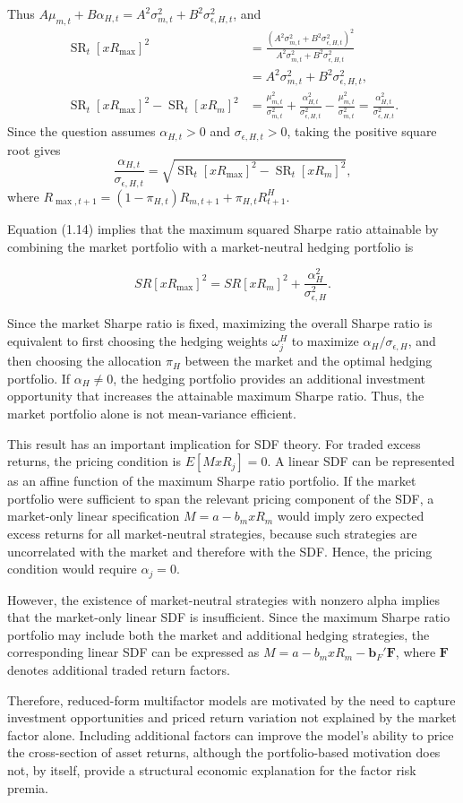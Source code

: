 \documentclass[11pt]{article}
\begin{document}
Thus $A\mu_{m,t}+B\alpha_{H,t}
=A^2\sigma^2_{m,t}+B^2\sigma^2_{\epsilon,H,t}$, and
\begin{align*}
\operatorname{SR}_t[xR_{\max}]^2
&=\frac{(A^2\sigma^2_{m,t}+B^2\sigma^2_{\epsilon,H,t})^2}
{A^2\sigma^2_{m,t}+B^2\sigma^2_{\epsilon,H,t}}\\
&=A^2\sigma^2_{m,t}+B^2\sigma^2_{\epsilon,H,t},\\
\operatorname{SR}_t[xR_{\max}]^2-\operatorname{SR}_t[xR_m]^2
&=\frac{\mu_{m,t}^2}{\sigma^2_{m,t}}
+\frac{\alpha_{H,t}^2}{\sigma^2_{\epsilon,H,t}}
-\frac{\mu_{m,t}^2}{\sigma^2_{m,t}}
=\frac{\alpha_{H,t}^2}{\sigma^2_{\epsilon,H,t}}.
\end{align*}
Since the question assumes $\alpha_{H,t}>0$ and
$\sigma_{\epsilon,H,t}>0$, taking the positive square root gives
\[
\boxed{\frac{\alpha_{H,t}}{\sigma_{\epsilon,H,t}}
=\sqrt{\operatorname{SR}_t[xR_{\max}]^2-\operatorname{SR}_t[xR_m]^2},}
\]
where $R_{\max,t+1}=(1-\pi_{H,t})R_{m,t+1}+\pi_{H,t}R^H_{t+1}$.


Equation (1.14) implies that the maximum squared Sharpe ratio attainable by combining the market portfolio with a market-neutral hedging portfolio is

\[
SR[xR_{\max}]^2
=
SR[xR_m]^2
+
\frac{\alpha_H^2}{\sigma_{\epsilon,H}^2}.
\]

Since the market Sharpe ratio is fixed, maximizing the overall Sharpe ratio is equivalent to first choosing the hedging weights \(\omega_j^H\) to maximize \(\alpha_H/\sigma_{\epsilon,H}\), and then choosing the allocation \(\pi_H\) between the market and the optimal hedging portfolio. If \(\alpha_H\neq0\), the hedging portfolio provides an additional investment opportunity that increases the attainable maximum Sharpe ratio. Thus, the market portfolio alone is not mean-variance efficient.

This result has an important implication for SDF theory. For traded excess returns, the pricing condition is \(E[MxR_j]=0\). A linear SDF can be represented as an affine function of the maximum Sharpe ratio portfolio. If the market portfolio were sufficient to span the relevant pricing component of the SDF, a market-only linear specification \(M=a-b_mxR_m\) would imply zero expected excess returns for all market-neutral strategies, because such strategies are uncorrelated with the market and therefore with the SDF. Hence, the pricing condition would require \(\alpha_j=0\).

However, the existence of market-neutral strategies with nonzero alpha implies that the market-only linear SDF is insufficient. Since the maximum Sharpe ratio portfolio may include both the market and additional hedging strategies, the corresponding linear SDF can be expressed as \(M=a-b_mxR_m-\boldsymbol b_F'\boldsymbol F\), where \(\boldsymbol F\) denotes additional traded return factors.

Therefore, reduced-form multifactor models are motivated by the need to capture investment opportunities and priced return variation not explained by the market factor alone. Including additional factors can improve the model's ability to price the cross-section of asset returns, although the portfolio-based motivation does not, by itself, provide a structural economic explanation for the factor risk premia.
\end{document}
